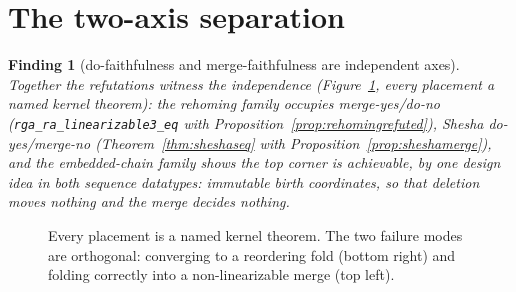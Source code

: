 \documentclass[11pt]{article}
\newtheorem*{finding}{Finding}
\newcommand{\lean}[1]{\texttt{#1}}
\newcommand{\code}[1]{\texttt{#1}}
\begin{document}
\section{The two-axis separation}
\label{sec:axes}

\begin{finding}[do-faithfulness and merge-faithfulness are
independent axes]
Together the refutations witness the independence
(Figure~\ref{fig:axes}, every placement a named kernel theorem): the
rehoming family occupies merge-yes/do-no
(\lean{rga\_ra\_linearizable3\_eq} with
Proposition~\ref{prop:rehomingrefuted}), Shesha do-yes/merge-no
(Theorem~\ref{thm:sheshaseq} with
Proposition~\ref{prop:sheshamerge}), and the embedded-chain family
shows the top corner is achievable, by one design idea in both
sequence datatypes: immutable birth coordinates, so that deletion
moves nothing and the merge decides nothing.
\end{finding}

\begin{figure}[h]
\centering
{}
\caption{Every placement is a named kernel theorem. The two failure
modes are orthogonal: converging to a reordering fold (bottom right)
and folding correctly into a non-linearizable merge (top left).}
\label{fig:axes}
\end{figure}
\end{document}
